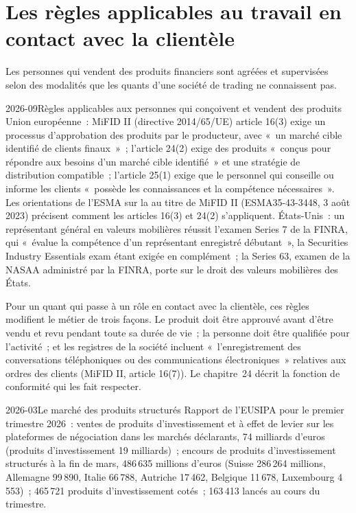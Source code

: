 \section{Les règles applicables au travail en contact avec la clientèle}

Les personnes qui vendent des produits financiers sont agréées et supervisées selon des modalités que les quants d'une société de trading ne connaissent pas.

\begin{dated}{2026-09}{Règles applicables aux personnes qui conçoivent et vendent des produits}\label{dat:in:structurer-sales-and-sales-trader:rules}
Union européenne~: MiFID II (directive 2014/65/UE) article 16(3) exige un processus d'approbation des produits par le producteur, avec «~un
marché cible identifié de clients finaux~»~; l'article 24(2) exige des produits «~conçus pour répondre aux besoins d'un
marché cible identifié~» et une stratégie de distribution compatible~; l'article 25(1) exige que le personnel qui conseille ou informe les clients
«~possède les connaissances et la compétence nécessaires~». Les orientations de l'ESMA sur la  au titre de MiFID II (ESMA35-43-3448, 3
août 2023) précisent comment les articles 16(3) et 24(2) s'appliquent. États-Unis~: un représentant général en valeurs mobilières réussit
l'examen Series 7 de la FINRA, qui «~évalue la compétence d'un représentant enregistré débutant~», la Securities
Industry Essentials exam étant exigée en complément~; la Series 63, examen de la NASAA administré par la FINRA, porte sur le droit des valeurs mobilières des États.
\end{dated}

Pour un quant qui passe à un rôle en contact avec la clientèle, ces règles modifient le métier de trois façons. Le produit doit être approuvé
avant d'être vendu et revu pendant toute sa durée de vie~; la personne doit être qualifiée pour l'activité~; et les registres de la société
incluent «~l'enregistrement des conversations téléphoniques ou des communications électroniques~» relatives aux ordres des clients (MiFID II,
article 16(7)). Le chapitre~24 décrit la fonction de conformité qui les fait respecter.

\begin{dated}{2026-03}{Le marché des produits structurés}\label{dat:in:structurer-sales-and-sales-trader:market}
Rapport de l'EUSIPA pour le premier trimestre 2026~: ventes de produits d'investissement et à effet de levier sur les plateformes de négociation dans les
marchés déclarants, 74 milliards d'euros (produits d'investissement 19 milliards)~; encours de produits d'investissement structurés à la fin de mars,
486\,635 millions d'euros (Suisse 286\,264 millions, Allemagne 99\,890, Italie 66\,788, Autriche
17\,462, Belgique 11\,678, Luxembourg 4\,553)~; 465\,721 produits d'investissement cotés~; 163\,413 lancés au cours du trimestre.
\end{dated}

